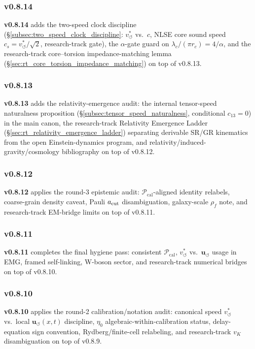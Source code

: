 \documentclass[11pt]{article}
\theoremstyle{definition}
\theoremstyle{plain}
\theoremstyle{remark}
\newcommand{\rhoF}{{\rho_{\!f}}}
\newcommand{\rc}{{r_c}}
\newcommand{\vchar}{v_{\!\boldsymbol{\circlearrowleft}}^{\ast}}
\newcommand{\uswirl}{\mathbf{u}_{\!\boldsymbol{\circlearrowleft}}}
\begin{document}
        \subsubsection{v0.8.14}
            \textbf{v0.8.14} adds the two-speed clock discipline (\S\ref{subsec:two_speed_clock_discipline}: $\vchar$ vs.\ $c$, NLSE core sound speed $c_s=\vchar/\sqrt{2}$, research-track gate), the $\alpha$-gate guard on $\lambda_c/(\pi\rc)=4/\alpha$, and the research-track core--torsion impedance-matching lemma (\S\ref{sec:rt_core_torsion_impedance_matching}) on top of v0.8.13.

        \subsubsection{v0.8.13}
            \textbf{v0.8.13} adds the relativity-emergence audit: the internal tensor-speed naturalness proposition (\S\ref{subsec:tensor_speed_naturalness}, conditional $c_{13}=0$) in the main canon, the research-track Relativity Emergence Ladder (\S\ref{sec:rt_relativity_emergence_ladder}) separating derivable SR/GR kinematics from the open Einstein-dynamics program, and relativity/induced-gravity/cosmology bibliography on top of v0.8.12.

        \subsubsection{v0.8.12}
            \textbf{v0.8.12} applies the round-3 epistemic audit: $\mathcal{P}_{\mathrm{cal}}$-aligned identity relabels, coarse-grain density caveat, Pauli $a_{\rm cut}$ disambiguation, galaxy-scale $\rhoF$ note, and research-track EM-bridge limits on top of v0.8.11.

        \subsubsection{v0.8.11}
            \textbf{v0.8.11} completes the final hygiene pass: consistent $\mathcal{P}_{\mathrm{cal}}$, $\vchar$ vs.\ $\uswirl$ usage in EMG, framed self-linking, W-boson sector, and research-track numerical bridges on top of v0.8.10.

        \subsubsection{v0.8.10}
            \textbf{v0.8.10} applies the round-2 calibration/notation audit: canonical speed $\vchar$ vs.\ local $\uswirl(x,t)$ discipline, $\eta_0$ algebraic-within-calibration status, delay-equation sign convention, Rydberg/finite-cell relabeling, and research-track $v_K$ disambiguation on top of v0.8.9.
\end{document}
